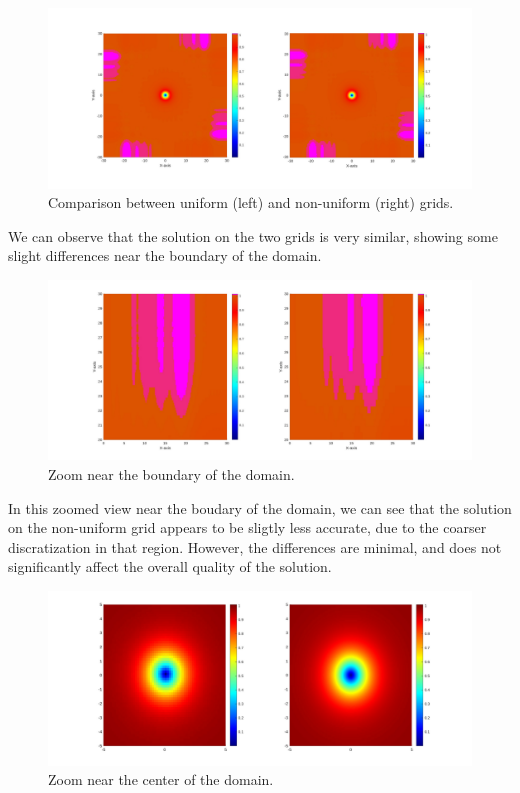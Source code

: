 \begin{figure}[H]
    \centering
    \includegraphics[width=\textwidth]{img/comparison_unfd.pdf}
    \caption{Comparison between uniform (left) and non-uniform (right) grids.}
\end{figure}

We can observe that the solution on the two grids is very similar, showing some slight differences near the boundary of the domain. 

\begin{figure}[H]
    \centering
    \includegraphics[width=\textwidth]{img/comparison_unfd_zoom_boundary.pdf}
    \caption{Zoom near the boundary of the domain.}
\end{figure}

In this zoomed view near the boudary of the domain, we can see that the solution on the non-uniform grid appears to be sligtly less accurate, due to the coarser discratization in that region. However, the differences are minimal, and does not significantly affect the overall quality of the solution.

\begin{figure}[H]
    \centering
    \includegraphics[width=\textwidth]{img/comparison_unfd_5.pdf}
    \caption{Zoom near the center of the domain.}
\end{figure}

